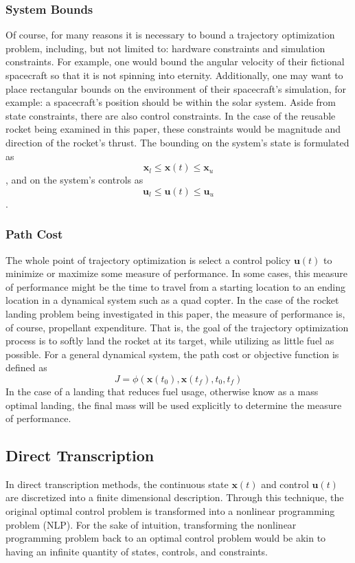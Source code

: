 \documentclass{article}
\begin{document}
\subsubsection{System Bounds}
Of course, for many reasons it is necessary to bound a trajectory optimization problem, including, but not limited to: hardware constraints and simulation constraints. For example, one would bound the angular velocity of their fictional spacecraft so that it is not spinning into eternity. Additionally, one may want to place rectangular bounds on the environment of their spacecraft's simulation, for example: a spacecraft's position should be within the solar system. Aside from state constraints, there are also control constraints. In the case of the reusable rocket being examined in this paper, these constraints would be magnitude and direction of the rocket's thrust. The bounding on the system's state is formulated as
$$
\mathbf{x}_l \leq \mathbf{x}(t) \leq \mathbf{x}_u
$$
, and on the system's controls as 
$$
\mathbf{u}_l \leq \mathbf{u}(t) \leq \mathbf{u}_u
$$.

\subsubsection{Path Cost}
The whole point of trajectory optimization is select a control policy $\mathbf{u}(t)$ to minimize or maximize some measure of performance. In some cases, this measure of performance might be the time to travel from a starting location to an ending location in a dynamical system such as a quad copter. In the case of the rocket landing problem being investigated in this paper, the measure of performance is, of course, propellant expenditure. That is, the goal of the trajectory optimization process is to softly land the rocket at its target, while utilizing as little fuel as possible. For a general dynamical system, the path cost or objective function is defined as
$$
J = \phi(\mathbf{x}(t_0),\mathbf{x}(t_f),t_0,t_f)
$$
In the case of a landing that reduces fuel usage, otherwise know as a mass optimal landing, the final mass will be used explicitly to determine the measure of performance.

\subsection{Direct Transcription}
In direct transcription methods, the continuous state $\mathbf{x}(t)$ and control $\mathbf{u}(t)$ are discretized into a finite dimensional description. Through this technique, the original optimal control problem is transformed into a nonlinear programming problem (NLP). For the sake of intuition, transforming the nonlinear programming problem back to an optimal control problem would be akin to having an infinite quantity of states, controls, and constraints.
\end{document}
